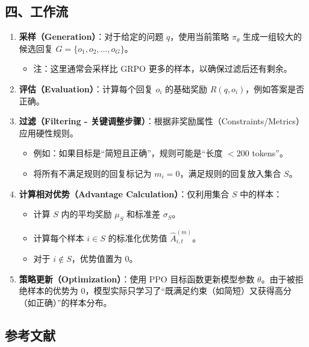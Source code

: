 \hypertarget{ux56dbux5de5ux4f5cux6d41}{%
\subsection{四、工作流}\label{ux56dbux5de5ux4f5cux6d41}}

\begin{enumerate}
\def\labelenumi{\arabic{enumi}.}
\tightlist
\item
  \textbf{采样（Generation）}：对于给定的问题 \(q\)，使用当前策略 \(\pi_\theta\) 生成一组较大的候选回复 \(G=\{o_1,o_2,\ldots,o_G\}\)。

  \begin{itemize}
  \tightlist
  \item
    注：这里通常会采样比 GRPO 更多的样本，以确保过滤后还有剩余。
  \end{itemize}
\item
  \textbf{评估（Evaluation）}：计算每个回复 \(o_i\) 的基础奖励 \(R(q,o_i)\)，例如答案是否正确。
\item
  \textbf{过滤（Filtering - 关键调整步骤）}：根据非奖励属性（Constraints/Metrics）应用硬性规则。

  \begin{itemize}
  \tightlist
  \item
    例如：如果目标是``简短且正确''，规则可能是``长度 \(<200\) tokens''。
  \item
    将所有不满足规则的回复标记为 \(m_i=0\)，满足规则的回复放入集合 \(S\)。
  \end{itemize}
\item
  \textbf{计算相对优势（Advantage Calculation）}：仅利用集合 \(S\) 中的样本：

  \begin{itemize}
  \tightlist
  \item
    计算 \(S\) 内的平均奖励 \(\mu_S\) 和标准差 \(\sigma_S\)。
  \item
    计算每个样本 \(i \in S\) 的标准化优势值 \(\hat{A}_{i,t}^{(m)}\)。
  \item
    对于 \(i \notin S\)，优势值置为 \(0\)。
  \end{itemize}
\item
  \textbf{策略更新（Optimization）}：使用 PPO 目标函数更新模型参数 \(\theta\)。由于被拒绝样本的优势为 \(0\)，模型实际只学习了``既满足约束（如简短）又获得高分（如正确）''的样本分布。
\end{enumerate}

\hypertarget{ux53c2ux8003ux6587ux732e-112}{%
\subsection{参考文献}\label{ux53c2ux8003ux6587ux732e-112}}

